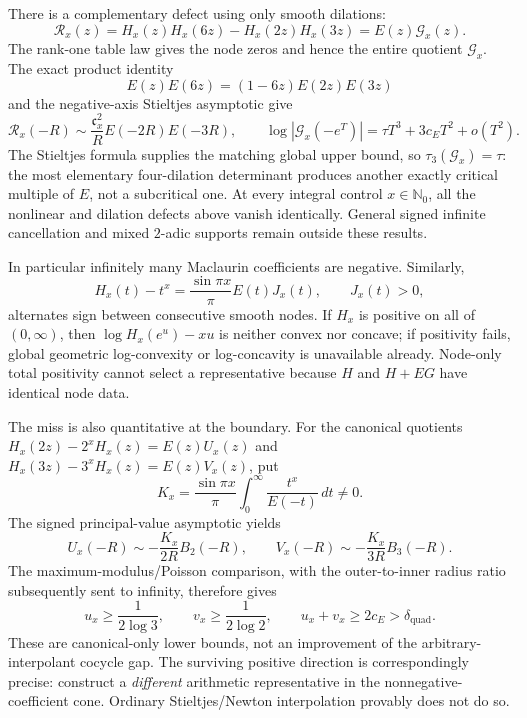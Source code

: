 \documentclass[11pt,oneside]{article}
\theoremstyle{definition}
\theoremstyle{remark}
\newcommand{\Nzero}{\mathbb N_0}
\begin{document}
There is a complementary defect using only smooth dilations:
\begin{equation}
 \mathcal R_x(z)=H_x(z)H_x(6z)-H_x(2z)H_x(3z)=E(z)\mathcal G_x(z).
 \label{crit:eq-four-dilation-defect}
\end{equation}
The rank-one table law gives the node zeros and hence the entire quotient $\mathcal G_x$.
The exact product identity
\[
 E(z)E(6z)=(1-6z)E(2z)E(3z)
\]
and the negative-axis Stieltjes asymptotic give
\begin{equation}
 \mathcal R_x(-R)\sim
 \frac{\mathfrak c_x^2}{R}E(-2R)E(-3R),
 \qquad
 \log|\mathcal G_x(-e^T)|
 =\tau T^3+3c_ET^2+o(T^2).
 \label{crit:eq-four-dilation-growth}
\end{equation}
The Stieltjes formula supplies the matching global upper bound, so
$\tau_3(\mathcal G_x)=\tau$: the most elementary four-dilation determinant produces another
exactly critical multiple of $E$, not a subcritical one.  At every integral control
$x\in\Nzero$, all the nonlinear and dilation defects above vanish identically.  General
signed infinite cancellation and mixed
$2$-adic supports remain outside these results.

In particular infinitely many Maclaurin coefficients are negative.  Similarly,
\[
 H_x(t)-t^x=\frac{\sin\pi x}{\pi}E(t)J_x(t),\qquad J_x(t)>0,
\]
alternates sign between consecutive smooth nodes.  If $H_x$ is positive on all of
$(0,\infty)$, then $\log H_x(e^u)-xu$ is neither convex nor concave; if positivity fails,
global geometric log-convexity or log-concavity is unavailable already.  Node-only total
positivity cannot select a representative because $H$ and $H+EG$ have identical node data.

The miss is also quantitative at the boundary.  For the canonical quotients
$H_x(2z)-2^xH_x(z)=E(z)U_x(z)$ and
$H_x(3z)-3^xH_x(z)=E(z)V_x(z)$, put
\[
 K_x=\frac{\sin\pi x}{\pi}\int_0^\infty\frac{t^x}{E(-t)}\,dt\ne0.
\]
The signed principal-value asymptotic yields
\[
 U_x(-R)\sim-\frac{K_x}{2R}B_2(-R),\qquad
 V_x(-R)\sim-\frac{K_x}{3R}B_3(-R).
\]
The maximum-modulus/Poisson comparison, with the outer-to-inner radius ratio subsequently
sent to infinity, therefore gives
\begin{equation}
 u_x\ge\frac1{2\log3},\qquad
 v_x\ge\frac1{2\log2},\qquad
 u_x+v_x\ge2c_E>\delta_{\mathrm{quad}}.
 \label{crit:eq-canonical-quotient-lower}
\end{equation}
These are canonical-only lower bounds, not an improvement of the arbitrary-interpolant
cocycle gap.  The surviving positive direction is correspondingly precise: construct a
\emph{different} arithmetic representative in the nonnegative-coefficient cone.  Ordinary
Stieltjes/Newton interpolation provably does not do so.
\end{document}
